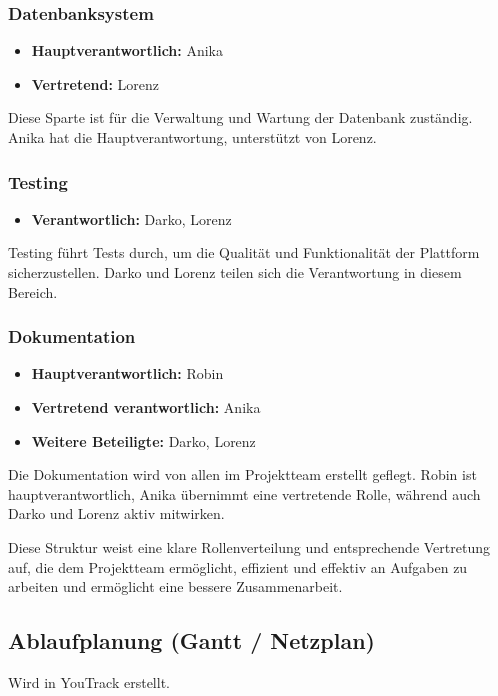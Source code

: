 \subsubsection{Datenbanksystem}
\begin{itemize}
    \item \textbf{Hauptverantwortlich:} Anika
    \item \textbf{Vertretend:} Lorenz
\end{itemize}
Diese Sparte ist für die Verwaltung und Wartung der Datenbank zuständig.
Anika hat die Hauptverantwortung, unterstützt von Lorenz.

\subsubsection{Testing}
\begin{itemize}
    \item \textbf{Verantwortlich:} Darko, Lorenz
\end{itemize}
Testing führt Tests durch, um die Qualität und Funktionalität der Plattform sicherzustellen.
Darko und Lorenz teilen sich die Verantwortung in diesem Bereich.

\subsubsection{Dokumentation}
\begin{itemize}
    \item \textbf{Hauptverantwortlich:} Robin
    \item \textbf{Vertretend verantwortlich:} Anika
    \item \textbf{Weitere Beteiligte:} Darko, Lorenz
\end{itemize}
Die Dokumentation wird von allen im Projektteam erstellt geflegt.
Robin ist hauptverantwortlich, Anika übernimmt eine vertretende Rolle, während auch Darko und Lorenz aktiv mitwirken.

Diese Struktur weist eine klare Rollenverteilung und entsprechende Vertretung auf, die dem Projektteam ermöglicht, effizient und effektiv an Aufgaben zu arbeiten und ermöglicht eine bessere Zusammenarbeit.



\subsection{Ablaufplanung (Gantt / Netzplan)}\label{subsec:Ablaufplan}
Wird in YouTrack erstellt.

